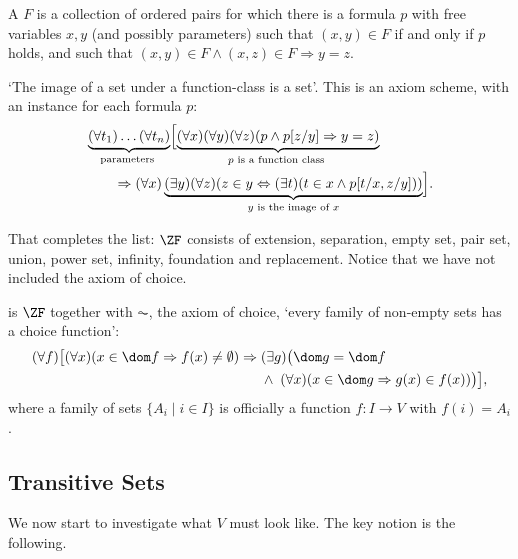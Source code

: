 \begin{definition}
  A  $F$ is a collection of ordered pairs for which there is a formula $p$ with free variables $x, y$ (and possibly parameters) such that $(x, y) \in F$ if and only if $p$ holds, and such that $(x,y) \in F \land (x, z) \in F \Rightarrow y = z$.
\end{definition}

\begin{axiom}[Replacement]
  `The image of a set under a function-class is a set'. This is an axiom scheme, with an instance for each formula $p$:
  \begin{align*}
      & \underbrace{\left(\forall t_1\right) \ldots\left(\forall t_n\right)}_{\text {parameters }}\Bigl[\underbrace{(\forall x)(\forall y)(\forall z)(p \land p[z / y] \Rightarrow y=z)}_{p \text { is a function class }} \\
      & \qquad \Rightarrow (\forall x) \underbrace{(\exists y)(\forall z)(z \in y \Leftrightarrow(\exists t)(t \in x \land p[t / x , z / y]))}_{y \text { is the image of } x}\Bigr].
  \end{align*}
\end{axiom}

That completes the list: $\ZF$ consists of extension, separation, empty set, pair set, union, power set, infinity, foundation and replacement. Notice that we have not included the axiom of choice.

\begin{definition}[ZFC]
  \vocab{$\ZFC$} is $\ZF$ together with $\AC$, the axiom of choice, `every family of non-empty sets has a choice function':
  \begin{align*}
    (\forall f)\bigl[(\forall x)(x \in \dom f \Rightarrow f(x) \neq \emptyset) \Rightarrow \; &(\exists g)\bigl(\dom g = \dom f \\
    &\land \; (\forall x)(x \in \dom g \Rightarrow g(x) \in f(x))\bigr)\bigr],
  \end{align*}
  where a family of sets $\{A_i \mid i \in I\}$ is officially a function $f : I \to V$ with $f(i) = A_i$.
\end{definition}

\subsection{Transitive Sets}

We now start to investigate what $V$ must look like. The key notion is the following.

